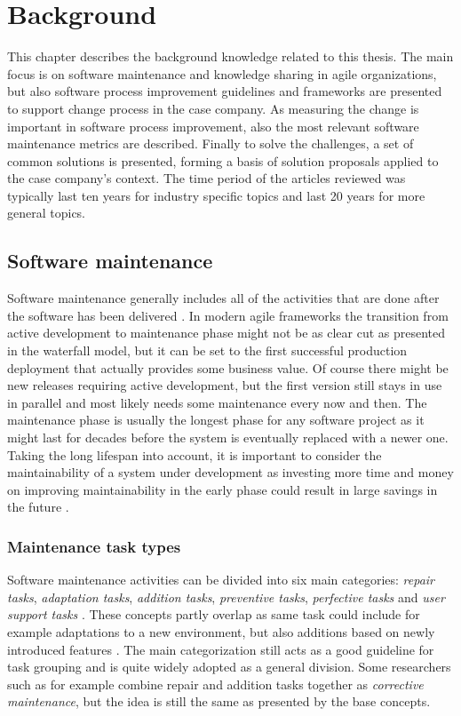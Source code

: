 \chapter{Background}
\label{chapter:literature}

This chapter describes the background knowledge related to this thesis. The main focus is on software maintenance and knowledge sharing in agile organizations, but also
software process improvement guidelines and frameworks are presented to support change process in the case company. As measuring the change is important in software
process improvement, also the most relevant software maintenance metrics are described. Finally to solve the challenges, a set of common solutions is presented,
forming a basis of solution proposals applied to the case company's context. The time period of the articles reviewed was typically
last ten years for industry specific topics and last 20 years for more general topics.

\section{Software maintenance}

Software maintenance generally includes all of the activities that are done after the software has been delivered \citep{Sommerville2011}.
In modern agile frameworks the transition from
active development to maintenance phase might not be as clear cut as presented in the waterfall model, but it can be set to the first successful production deployment
that actually provides some business value.
Of course there might be new releases requiring active development, but the first version still stays in use in parallel and most likely needs some maintenance
every now and then. The maintenance phase is usually the longest phase for any software project as it might last for decades before the system
is eventually replaced with a newer one.
Taking the long lifespan into account, it is important to consider the maintainability of a system under development
as investing more time and money on improving maintainability in the early phase
could result in large savings in the future \citep{Sommerville2011}.

\subsection{Maintenance task types}

Software maintenance activities can be divided into six main categories: \emph{repair tasks}, \emph{adaptation tasks}, \emph{addition tasks}, \emph{preventive tasks}, \emph{perfective tasks}
and \emph{user support tasks} \citep{Desharnais2010}\citep{Sommerville2011}. These concepts partly overlap as same task could include
for example adaptations to a new environment, but also additions
based on newly introduced features \citep{Sommerville2011}. The main categorization still acts as a good guideline for task grouping and is
quite widely adopted as a general division. Some researchers such as
\citet{Desharnais2010} for example combine repair and addition tasks together as \emph{corrective maintenance}, but the idea is still the same as presented by 
the base concepts.

